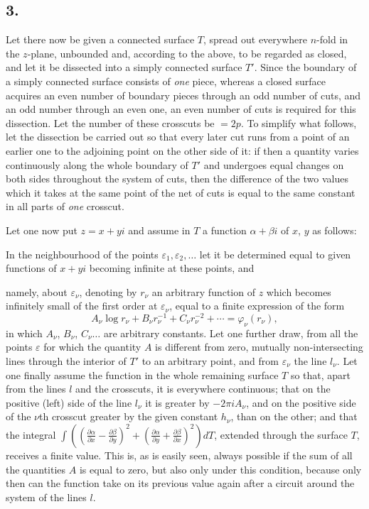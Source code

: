 \documentclass{article}
\begin{document}
\subsection*{3.}

Let there now be given a connected surface $T$, spread out everywhere $n$-fold in the $z$-plane, unbounded and, according to the above, to be regarded as closed, and let it be dissected into a simply connected surface $T'$. Since the boundary of a simply connected surface consists of \emph{one} piece, whereas a closed surface acquires an even number of boundary pieces through an odd number of cuts, and an odd number through an even one, an even number of cuts is required for this dissection. Let the number of these crosscuts be $= 2p$. To simplify what follows, let the dissection be carried out so that every later cut runs from a point of an earlier one to the adjoining point on the other side of it: if then a quantity varies continuously along the whole boundary of $T'$ and undergoes equal changes on both sides throughout the system of cuts, then the difference of the two values which it takes at the same point of the net of cuts is equal to the same constant in all parts of \emph{one} crosscut.

Let one now put $z = x + yi$ and assume in $T$ a function $\alpha + \beta i$ of $x$, $y$ as follows:

In the neighbourhood of the points $\varepsilon_{1}, \varepsilon_{2}, \ldots$ let it be determined equal to given functions of $x + yi$ becoming infinite at these points, and

namely, about $\varepsilon_{\nu}$, denoting by $r_{\nu}$ an arbitrary function of $z$ which becomes infinitely small of the first order at $\varepsilon_{\nu}$, equal to a finite expression of the form
\[ A_{\nu} \log r_{\nu} + B_{\nu} r_{\nu}^{-1} + C_{\nu} r_{\nu}^{-2} + \cdots = \varphi_{\nu}(r_{\nu}), \]
in which $A_{\nu}$, $B_{\nu}$, $C_{\nu} \ldots$ are arbitrary constants. Let one further draw, from all the points $\varepsilon$ for which the quantity $A$ is different from zero, mutually non-intersecting lines through the interior of $T'$ to an arbitrary point, and from $\varepsilon_{\nu}$ the line $l_{\nu}$. Let one finally assume the function in the whole remaining surface $T$ so that, apart from the lines $l$ and the crosscuts, it is everywhere continuous; that on the positive (left) side of the line $l_{\nu}$ it is greater by $-2\pi i A_{\nu}$, and on the positive side of the $\nu$th crosscut greater by the given constant $h_{\nu}$, than on the other; and that the integral $\displaystyle\int \left(\left(\frac{\partial\alpha}{\partial x} - \frac{\partial\beta}{\partial y}\right)^{2} + \left(\frac{\partial\alpha}{\partial y} + \frac{\partial\beta}{\partial x}\right)^{2}\right) dT$, extended through the surface $T$, receives a finite value. This is, as is easily seen, always possible if the sum of all the quantities $A$ is equal to zero, but also only under this condition, because only then can the function take on its previous value again after a circuit around the system of the lines $l$.
\end{document}
